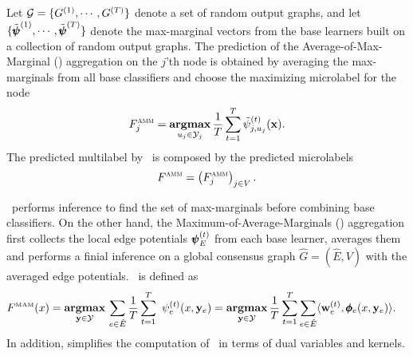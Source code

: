 {%
Let $\mathcal{G}=\{G^{(1)},\cdots,G^{(T)}\}$ denote a set of random output graphs, and let $\{\tilde{\pmb \psi}^{(1)},\cdots,\tilde{\pmb \psi}^{(T)}\}$ denote the max-marginal vectors from the base learners built on a collection of random output graphs.
The prediction of the Average-of-Max-Marginal (\amm) aggregation on the $j$'th node is obtained by averaging the max-marginals from all base classifiers and choose the maximizing microlabel for the node 
\begin{align*}
	F_j^{\text{{\sc amm}}}=\underset{u_j\in\mathcal{Y}_j}{\textbf{argmax}}\,\frac{1}{T}\sum_{t=1}^{T}\tilde{\psi}_{j,u_j}^{(t)}(\mathbf {x}).	\end{align*}
The predicted multilabel by \amm\ is composed by the predicted microlabels
\begin{align*}
	F^{\text{{\sc amm}}}=\left(F_j^{\text{{\sc amm}}}\right)_{j\in V}.
\end{align*}

\amm\ performs inference to find the set of max-marginals before combining base classifiers. 
On the other hand, the Maximum-of-Average-Marginals (\mam) aggregation first collects the local edge potentials $\pmb \psi_E^{(t)}$ from each base learner, averages them and performs a finial inference on a global consensus graph $\hat{G}=(\hat{E},V)$ with the averaged edge potentials.
\mam\ is defined as
\begin{align*}
	F^{\text{\tiny MAM}}(x) &= \underset{\vy \in \Ycal }{\argmax}\,\sum_{e\in \hat{E}}\frac{1}{T}\sum_{t=1}^{T}\ \psi^{(t)}_e(x,\vy_e)
	= \underset{\vy \in \Ycal}{\argmax}\, \frac{1}{T} \sum_{t=1}^T \sum_{e\in \hat{E}} \ip{\vw_e^{(t)}}{\phib_e(x,\vy_e)}. %
\end{align*}
In addition,  simplifies the computation of \mam\ in terms of dual variables and kernels.

}

